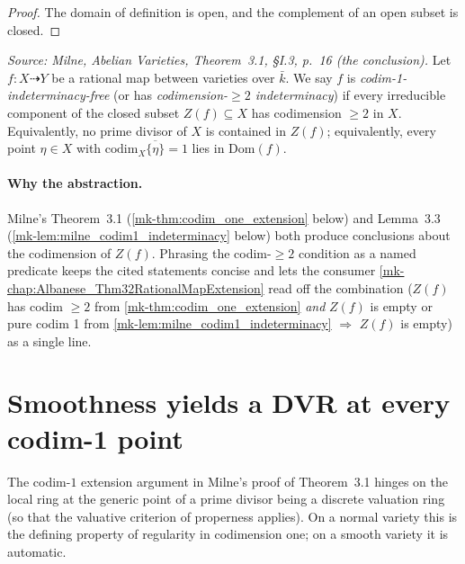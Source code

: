 \begin{proof}
  The domain of definition is open, and the complement of an open subset is closed.
\end{proof}

\begin{definition}\label{mk-def:codim_one_indeterminacy}
  \leanok

  \textit{Source: Milne, \emph{Abelian Varieties}, Theorem~3.1, \S I.3, p.~16 (the
  conclusion).}
  Let \(f \colon X \dashrightarrow Y\) be a rational map between varieties over \(\bar k\).
  We say \(f\) is \emph{codim-1-indeterminacy-free} (or has \emph{codimension-\(\geq 2\)
  indeterminacy}) if every irreducible component of the closed subset \(Z(f) \subseteq X\)
  has codimension \(\geq 2\) in \(X\). Equivalently, no prime divisor of \(X\) is contained in
  \(Z(f)\); equivalently, every point \(\eta \in X\) with \(\mathrm{codim}_X \overline{\{\eta\}} = 1\)
  lies in \(\mathrm{Dom}(f)\).

  \paragraph{Why the abstraction.} Milne's Theorem~3.1 (\ref{mk-thm:codim_one_extension}
  below) and Lemma~3.3 (\ref{mk-lem:milne_codim1_indeterminacy} below) both produce
  conclusions about the codimension of \(Z(f)\). Phrasing the codim-\(\geq 2\) condition
  as a named predicate keeps the cited statements concise and lets the consumer
  \ref{mk-chap:Albanese_Thm32RationalMapExtension} read off the combination
  (\(Z(f)\) has codim \(\geq 2\) from \ref{mk-thm:codim_one_extension} \emph{and} \(Z(f)\) is
  empty or pure codim 1 from \ref{mk-lem:milne_codim1_indeterminacy} \(\Rightarrow\) \(Z(f)\)
  is empty) as a single line.
\end{definition}

\section{Smoothness yields a DVR at every codim-1 point}
\label{mk-sec:smooth_dvr}

The codim-\(1\) extension argument in Milne's proof of Theorem~3.1 hinges on the local
ring at the generic point of a prime divisor being a discrete valuation ring (so that
the valuative criterion of properness applies). On a normal variety this is the
defining property of regularity in codimension one; on a smooth variety it is automatic.

